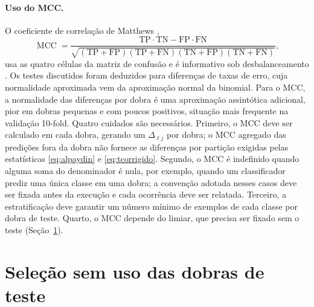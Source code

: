 \documentclass[11pt,a4paper]{article}
\newcommand{\MCC}{\operatorname{MCC}}
\begin{document}
\paragraph{Uso do MCC.}
O coeficiente de correlação de Matthews \citep{matthews1975comparison},
\begin{equation}
  \MCC=\frac{\mathrm{TP}\cdot \mathrm{TN}-\mathrm{FP}\cdot \mathrm{FN}}{\sqrt{(\mathrm{TP}+\mathrm{FP})(\mathrm{TP}+\mathrm{FN})(\mathrm{TN}+\mathrm{FP})(\mathrm{TN}+\mathrm{FN})}},
\end{equation}
usa as quatro células da matriz de confusão e é informativo sob
desbalanceamento \citep{chicco2020mcc}. Os testes discutidos foram deduzidos
para diferenças de taxas de erro, cuja normalidade aproximada vem da
aproximação normal da binomial. Para o MCC, a normalidade das diferenças por
dobra é uma aproximação assintótica adicional, pior em dobras pequenas e com
poucos positivos, situação mais frequente na validação 10-fold. Quatro
cuidados são necessários. Primeiro, o MCC deve ser calculado em cada dobra,
gerando um $\Delta_{\ell j}$ por dobra; o MCC agregado das predições fora da dobra não
fornece as diferenças por partição exigidas pelas estatísticas
\eqref{eq:alpaydin} e \eqref{eq:tcorrigido}. Segundo, o MCC é indefinido
quando alguma soma do denominador é nula, por exemplo, quando um classificador
prediz uma única classe em uma dobra; a convenção adotada nesses casos deve ser
fixada antes da execução e cada ocorrência deve ser relatada. Terceiro, a
estratificação deve garantir um número mínimo de exemplos de cada classe por
dobra de teste. Quarto, o MCC depende do limiar, que precisa ser fixado sem o
teste (Seção~\ref{sec:selecao}).

\section{Seleção sem uso das dobras de teste}\label{sec:selecao}
\end{document}
